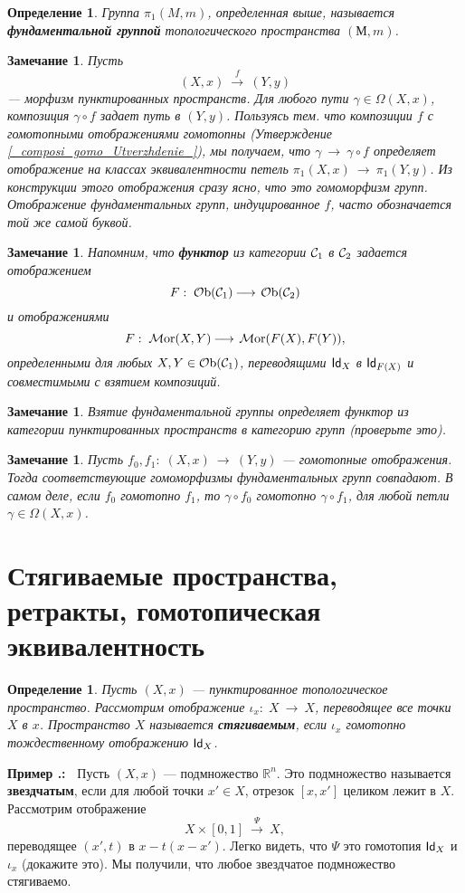 \documentclass[12pt]{book}
\newcommand{\arrow}{{\:\longrightarrow\:}}
\def\Id{{\operatorname{\sf Id}}}
\newcommand{\Ob}{\operatorname{{\cal O}b}}
\newcommand{\Mor}{\operatorname{{\cal M}or}}
\newcommand{\cac}{{\cal C}}
\def\R{{\mathbb R}}
\theoremstyle{upshape}
\newtheorem{zadacha}{Задача}[chapter]
\theoremstyle{generic}
\newtheorem{opredelenie}[teorema]{Определение}
\newtheorem{remark}[teorema]{Замечание}
\def\замечание{\begin{remark}}
\def\еза{\end{remark}}
\theoremstyle{upshapenonumber}
\newcommand{\следствие}{%
     \refstepcounter{teorema}
     {\noindent\bf Следствие \thechapter.\arabic{teorema}:\ }}
\newcommand{\пример}{%
     \refstepcounter{teorema}
     {\noindent\bf Пример \thechapter.\arabic{teorema}:\ }}
\newcommand{\лемма}{%
     \refstepcounter{teorema}
     {\noindent\bf Лемма \thechapter.\arabic{teorema}:\ }}
\newcommand{\теорема}{%
     \refstepcounter{teorema}
     {\noindent\bf Теорема \thechapter.\arabic{teorema}:\ }}
\newcommand{\утверждение}{%
     \refstepcounter{teorema}
     {\noindent\bf Утверждение \thechapter.\arabic{teorema}:\ }}
\def\бф{\bf}
\def\ем{\em}
\def\задача{\begin{zadacha}}
\def\ез{\end{zadacha}}
\def\еу{\end{ukazanie}}
\def\определение{\begin{opredelenie}}
\def\ео{\end{opredelenie}}
\def\енум{\begin{enumerate}}
\def\ее{\end{enumerate}}
\begin{document}
\определение
Группа $\pi_1(M, m)$, определенная выше, называется
{\бф фундаментальной группой} топологического
пространства $(М, m)$.
\ео

\замечание
Пусть \[ (X,x)\stackrel f\arrow (Y,y)\] --- морфизм пунктированных
пространств. Для любого пути $\gamma\in \Omega(X,x)$,
композиция $\gamma\circ f$ задает путь в $(Y,y)$.
Пользуясь тем. что композиции $f$ с гомотопными отображениями
гомотопны (Утверждение \ref{_composi_gomo_Utverzhdenie_}),
мы получаем, что $\gamma \arrow \gamma\circ f$ определяет
отображение на классах эквивалентности петель
$\pi_1(X,x) \arrow \pi_1(Y,y)$. 
Из конструкции этого отображения сразу ясно,
что это гомоморфизм групп. Отображение
фундаментальных групп, индуцированное $f$, часто
обозначается той же самой буквой.
\еза

\замечание
Напомним, что {\бф функтор} из категории $\cac_1$ в
$\cac_2$ задается отображением \[ F:\; \Ob(\cac_1) \arrow \Ob(\cac_2)\]
и отображениями  \[ F:\; \Mor(X,Y) \arrow \Mor(F(X), F(Y)),\]
определенными для любых $X, Y\in \Ob(\cac_1)$,
переводящими $\Id_X$ в $\Id_{F(X)}$ и 
совместимыми с взятием композиций.
\еза

\замечание
Взятие фундаментальной группы определяет
функтор из категории пунктированных пространств
в категорию групп (проверьте это).
\еза


\замечание
Пусть $f_0, f_1:\; (X,x) \arrow (Y,y)$ --- гомотопные отображения.
Тогда соответствующие гомоморфизмы фундаментальных
групп совпадают. В самом деле, если $f_0$ гомотопно $f_1$,
то $\gamma\circ f_0$ гомотопно $\gamma\circ f_1$, для
любой петли $\gamma\in \Omega(X,x)$.
\еза




\section{Стягиваемые пространства, ретракты,
гомотопическая  эквивалентность}


\определение
Пусть $(X,x)$ --- пунктированное топологическое
пространство. Рассмотрим отображение
$\iota_x:\; X \arrow X$, переводящее все точки
$X$ в $x$. Пространство $X$ называется
{\бф стягиваемым}, если $\iota_x$ гомотопно
тождественному отображению $\Id_X$.
\ео

\пример
Пусть $(X,x)$ --- подмножество $\R^n$.
Это подмножество называется {\бф звездчатым}, если
для любой точки $x'\in X$, отрезок
$[x,x']$ целиком лежит в $X$. 
Рассмотрим отображение
\[
X \times [0,1] \stackrel \Psi \arrow X,
\]
переводящее $(x',t)$ в $x-t(x-x')$.
Легко видеть, что $\Psi$ это гомотопия
$\Id_X$ и $\iota_x$ (докажите это).
Мы получили, что любое звездчатое подмножество
стягиваемо.
\end{document}
